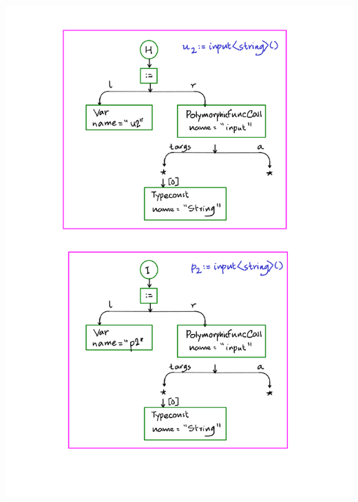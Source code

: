\documentclass[12pts, a4paper]{article}
\begin{document}
\begin{center}
\includegraphics[width=\textwidth]{../images/ACT-AST-13.png}


\end{center}
\end{document}
